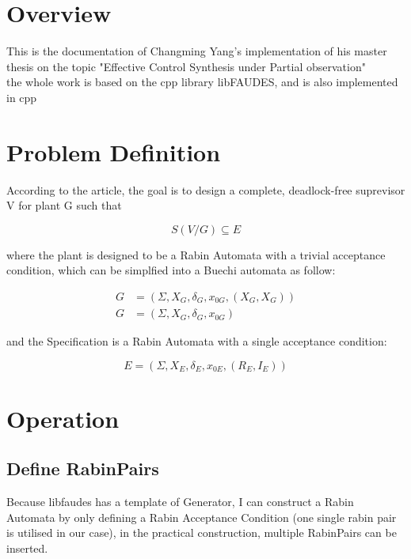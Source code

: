 \documentclass[
a4paper, 
12pt,
]{article}
\begin{document}
    \section{Overview}
    This is the documentation of Changming Yang's implementation of his master thesis on the topic "Effective Control Synthesis under Partial observation" \\
    the whole work is based on the cpp library libFAUDES, and is also implemented in cpp

    \section{Problem Definition}
    According to the article, the goal is to design a complete, deadlock-free suprevisor V for plant G such that 
    
    \begin{equation}
        S(V/G)\subseteq E
    \end{equation}

    where the plant is designed to be a Rabin Automata with a trivial acceptance condition, which can be simplfied into a Buechi automata as follow:
    
    \begin{equation}
        \begin{split}
            G&=(\Sigma, X_G, \delta _G , x_{0G} ,(X_G,X_G))  \\
            G&=(\Sigma, X_G, \delta _G , x_{0G})
        \end{split}
    \end{equation}

    and the Specification is a Rabin Automata with a single acceptance condition:

    \begin{equation}
        E=(\Sigma, X_E, \delta _E , x_{0E} ,(R_E,I_E))
    \end{equation}

    \section{Operation}
    \subsection{Define RabinPairs}
    Because libfaudes has a template of Generator, I can construct a Rabin Automata by only defining a Rabin Acceptance Condition (one single rabin pair is utilised in our case), in the practical construction, multiple RabinPairs can be inserted. \\
\end{document}

